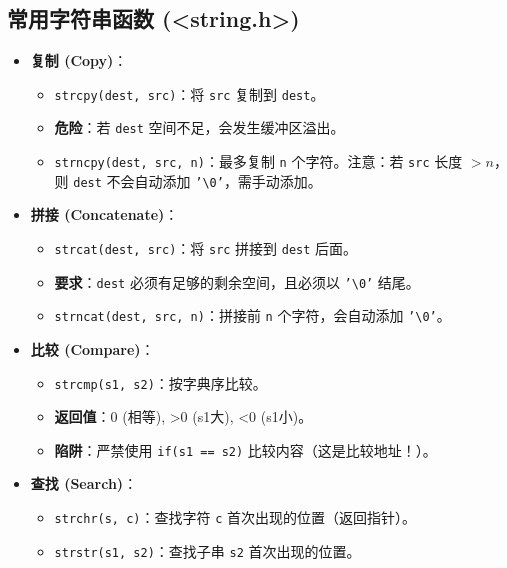 \documentclass[a4paper,12pt]{article}
\begin{document}
\subsection{常用字符串函数 (<string.h>)}
\label{sec:string_funcs}
\begin{itemize}
    \item \textbf{复制 (Copy)}：
    \begin{itemize}
        \item \texttt{strcpy(dest, src)}：将 \texttt{src} 复制到 \texttt{dest}。
        \item \textbf{危险}：若 \texttt{dest} 空间不足，会发生缓冲区溢出。
        \item \texttt{strncpy(dest, src, n)}：最多复制 \texttt{n} 个字符。注意：若 \texttt{src} 长度 $> n$，则 \texttt{dest} 不会自动添加 \texttt{'\textbackslash 0'}，需手动添加。
    \end{itemize}
    
    \item \textbf{拼接 (Concatenate)}：
    \begin{itemize}
        \item \texttt{strcat(dest, src)}：将 \texttt{src} 拼接到 \texttt{dest} 后面。
        \item \textbf{要求}：\texttt{dest} 必须有足够的剩余空间，且必须以 \texttt{'\textbackslash 0'} 结尾。
        \item \texttt{strncat(dest, src, n)}：拼接前 \texttt{n} 个字符，会自动添加 \texttt{'\textbackslash 0'}。
    \end{itemize}
    
    \item \textbf{比较 (Compare)}：
    \begin{itemize}
        \item \texttt{strcmp(s1, s2)}：按字典序比较。
        \item \textbf{返回值}：0 (相等), >0 (s1大), <0 (s1小)。
        \item \textbf{陷阱}：严禁使用 \texttt{if(s1 == s2)} 比较内容（这是比较地址！）。
    \end{itemize}
    
    \item \textbf{查找 (Search)}：
    \begin{itemize}
        \item \texttt{strchr(s, c)}：查找字符 \texttt{c} 首次出现的位置（返回指针）。
        \item \texttt{strstr(s1, s2)}：查找子串 \texttt{s2} 首次出现的位置。
    \end{itemize}
\end{itemize}
\end{document}
